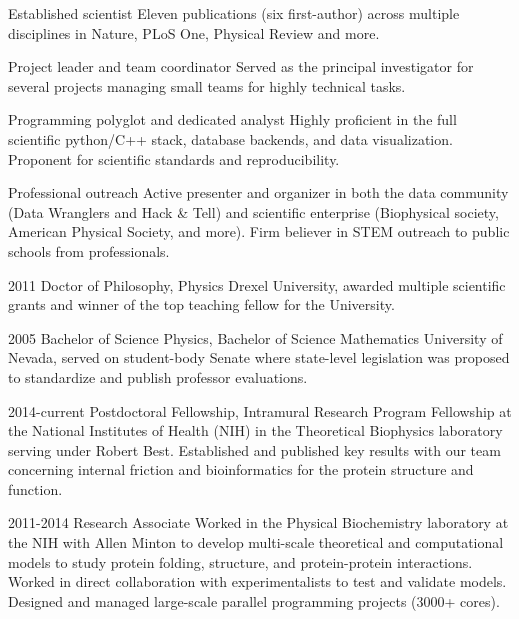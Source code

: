 \documentclass[]{scrartcl}
\begin{document}
\begin{cleanCV}

\vspace{-1em}


\Highlight
{Established scientist}
{Eleven publications (six first-author) across multiple disciplines in Nature, PLoS One, Physical Review and more.}

\Highlight
{Project leader and team coordinator}
{Served as the principal investigator for several projects managing small teams for highly technical tasks.}

\Highlight
{Programming polyglot and dedicated analyst}
{Highly proficient in the full scientific python/C++ stack, database backends, and data visualization. 
Proponent for scientific standards and reproducibility.}

\Highlight
{Professional outreach}
{Active presenter and organizer in both the data community (Data Wranglers and Hack \& Tell) and scientific enterprise (Biophysical society, American Physical Society, and more). Firm believer in STEM outreach to public schools from professionals.}


\WorkExperience
{2011}
{Doctor of Philosophy, Physics}
{Drexel University, awarded multiple scientific grants and winner of the top teaching fellow for the University.}

\WorkExperience
{2005}
{Bachelor of Science Physics, Bachelor of Science Mathematics}
{University of Nevada, served on student-body Senate where state-level legislation was proposed to standardize and publish professor evaluations.}



\WorkExperience
{2014-current}
{Postdoctoral Fellowship, Intramural Research Program}
{
Fellowship at the National Institutes of Health (NIH) in the Theoretical Biophysics laboratory serving under Robert Best.
Established and published key results with our team concerning internal friction and bioinformatics for the protein structure and function.
}

\WorkExperience
{2011-2014}
{Research Associate}
{
Worked in the Physical Biochemistry laboratory at the NIH with Allen Minton to develop multi-scale theoretical and computational models to study protein folding, structure, and protein-protein interactions.
Worked in direct collaboration with experimentalists to test and validate models.
Designed and managed large-scale parallel programming projects (3000+ cores).
}


\end{cleanCV}
\end{document}
